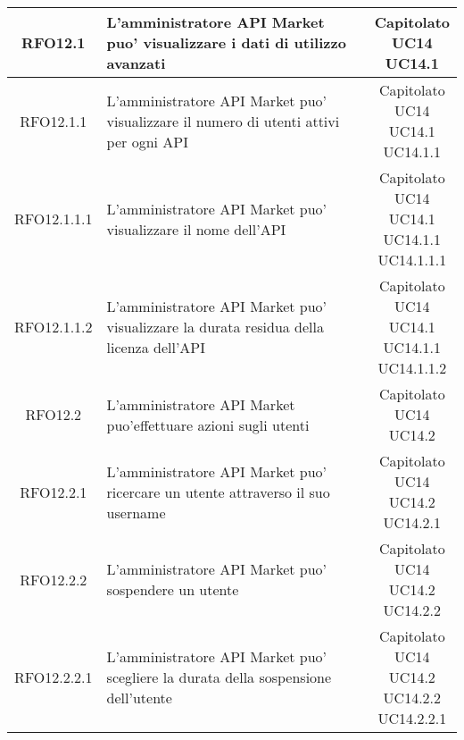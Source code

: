 \begin{longtable}{|c|p{8cm}|c|}
\hypertarget{RFO12.1}{RFO12.1} &  L'amministratore API Market puo' visualizzare i dati di utilizzo avanzati & \makecell*{Capitolato\\UC14\\UC14.1} \\
\hline

\hypertarget{RFO12.1.1}{RFO12.1.1} &  L'amministratore API Market puo' visualizzare il numero di utenti attivi per ogni API & \makecell*{Capitolato\\UC14\\UC14.1\\UC14.1.1} \\
\hline

\hypertarget{RFO12.1.1.1}{RFO12.1.1.1} &  L'amministratore API Market puo' visualizzare il nome dell'API & \makecell*{Capitolato\\UC14\\UC14.1\\UC14.1.1\\UC14.1.1.1} \\
\hline

\hypertarget{RFO12.1.1.2}{RFO12.1.1.2} &  L'amministratore API Market puo' visualizzare la durata residua della licenza dell'API & \makecell*{Capitolato\\UC14\\UC14.1\\UC14.1.1\\UC14.1.1.2} \\
\hline

\hypertarget{RFO12.2}{RFO12.2} &  L'amministratore API Market puo'effettuare azioni sugli utenti& \makecell*{Capitolato\\UC14\\UC14.2} \\
\hline

\hypertarget{RFO12.2.1}{RFO12.2.1} &  L'amministratore API Market puo' ricercare un utente attraverso il suo username& \makecell*{Capitolato\\UC14\\UC14.2\\UC14.2.1} \\
\hline

\hypertarget{RFO12.2.2}{RFO12.2.2} &  L'amministratore API Market puo' sospendere un utente& \makecell*{Capitolato\\UC14\\UC14.2\\UC14.2.2} \\
\hline

\hypertarget{RFO12.2.2.1}{RFO12.2.2.1} &  L'amministratore API Market puo' scegliere la durata della sospensione dell'utente& \makecell*{Capitolato\\UC14\\UC14.2\\UC14.2.2\\UC14.2.2.1} \\
\hline


\end{longtable}
